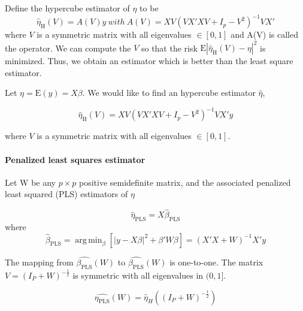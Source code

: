 \documentclass[draft]{article}
\DeclareMathOperator*{\argmin}{arg\,min}
\begin{document}
Define the hypercube estimator of $\eta$ to be
$$
\hat{\eta}_\text{H} (V) = A(V)y \:with \: A(V) = X V (V X'X V + I_p - V^2)^{-1} V X'
$$
where $V$ is a symmetric matrix with all eigenvalues $\in [0,1]$ and A(V) is called the operator. We can compute the $V$ so that the risk $\text{E} | \hat{\eta}_\text{H}(V) - \eta|^2$ is minimized. Thus, we obtain an estimator which is better than the least square estimator.

Let $\eta = \text{E}(y) = X\beta$. We would like to find an hypercube estimator $\hat{\eta}$,

$$
\hat{\eta}_\text{H} (V) = X V (V X'X V + I_p - V^2)^{-1} V X' y
$$

where $V$ is a symmetric matrix with all eigenvalues $\in [0,1]$.
%
%
%

\paragraph{Penalized least squares estimator}

	
	Let W be any $p \times p$ positive semidefinite matrix, and the associated penalized least squared (PLS) estimators of $\eta$

	$$
		\hat{\eta}_\text{PLS} = X \hat{\beta}_\text{PLS}
	$$
	where 
	$$
		\hat{\beta}_\text{PLS} = \argmin_{\beta} [ | y - X\beta |^2 + \beta' W \beta ] = (X'X + W)^{-1} X' y 
	$$
	
	The mapping from $\hat{\beta_\text{PLS}}(W)$ to $\hat{\beta_\text{PLS}}(W)$ is one-to-one. The matrix $V = (I_P + W)^{-\frac{1}{2}}$ is symmetric with all eigenvalues in $(0,1]$.
		
	$$
	\hat{\eta_\text{PLS}}(W) = \hat{\eta}_H((I_P + W)^{-\frac{1}{2}})	
	$$
		
\end{document}
